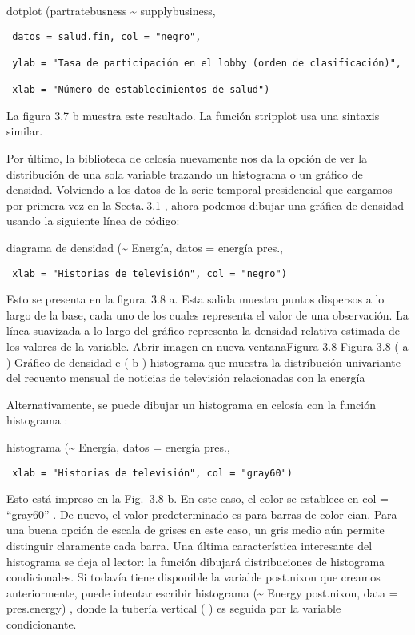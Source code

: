 \documentclass[
]{book}
\begin{document}
dotplot (partratebusness \textasciitilde{} supplybusiness,

\begin{verbatim}
 datos = salud.fin, col = "negro",

 ylab = "Tasa de participación en el lobby (orden de clasificación)",

 xlab = "Número de establecimientos de salud")
\end{verbatim}

La figura 3.7 b muestra este resultado. La función stripplot usa una sintaxis similar.

Por último, la biblioteca de celosía nuevamente nos da la opción de ver la distribución de una sola variable trazando un histograma o un gráfico de densidad. Volviendo a los datos de la serie temporal presidencial que cargamos por primera vez en la Secta. 3.1 , ahora podemos dibujar una gráfica de densidad usando la siguiente línea de código:

diagrama de densidad (\textasciitilde{} Energía, datos = energía pres.,

\begin{verbatim}
 xlab = "Historias de televisión", col = "negro")
\end{verbatim}

Esto se presenta en la figura  3.8 a. Esta salida muestra puntos dispersos a lo largo de la base, cada uno de los cuales representa el valor de una observación. La línea suavizada a lo largo del gráfico representa la densidad relativa estimada de los valores de la variable.
Abrir imagen en nueva ventanaFigura 3.8
Figura 3.8
( a ) Gráfico de densidad e ( b ) histograma que muestra la distribución univariante del recuento mensual de noticias de televisión relacionadas con la energía

Alternativamente, se puede dibujar un histograma en celosía con la función histograma :

histograma (\textasciitilde{} Energía, datos = energía pres.,

\begin{verbatim}
 xlab = "Historias de televisión", col = "gray60")
\end{verbatim}

Esto está impreso en la Fig.  3.8 b. En este caso, el color se establece en col = ``gray60'' . De nuevo, el valor predeterminado es para barras de color cian. Para una buena opción de escala de grises en este caso, un gris medio aún permite distinguir claramente cada barra. Una última característica interesante del histograma se deja al lector: la función dibujará distribuciones de histograma condicionales. Si todavía tiene disponible la variable post.nixon que creamos anteriormente, puede intentar escribir histograma (\textasciitilde{} Energy \textbar{} post.nixon, data = pres.energy) , donde la tubería vertical ( \textbar{} ) es seguida por la variable condicionante.
\end{document}
